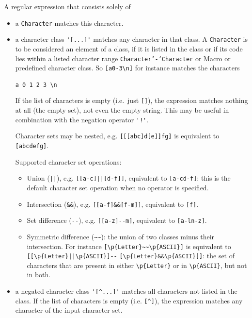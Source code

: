 \documentclass[11pt]{scrartcl}
\begin{document}
A regular expression that consists solely of
\begin{itemize}
\item
  a \texttt{Character} matches this character.

\item
  a character class \verb:'[...]': matches any character in that class.
  A \texttt{Character} is to be considered an element of a class, if it
  is listed in the class or if its code lies within a listed character
  range \texttt{Character'-'Character} or Macro or predefined character
  class. So \verb+[a0-3\n]+ for instance matches the characters

  \verb+a 0 1 2 3 \n+

  If the list of characters is empty (i.e.~just \verb+[]+), the expression
  matches nothing at all (the empty set), not even the empty string. This
  may be useful in combination with the negation operator \verb+'!'+.
  
  Character sets may be nested, e.g. \verb+[[[abc]d[e]]fg]+ is equivalent
  to \verb+[abcdefg]+.

  Supported character set operations:
    
  \begin{itemize}
  \item
    Union (\verb+||+), e.g. \verb+[[a-c]||[d-f]]+, equivalent to 
    \verb+[a-cd-f]+: this is the default character set operation when
    no operator is specified. 

  \item
    Intersection (\verb+&&+), e.g. \verb+[[a-f]&&[f-m]]+, equivalent to
    \verb+[f]+.
    
  \item
    Set difference (\verb+--+), e.g. \verb+[[a-z]--m]+, equivalent to
    \verb+[a-ln-z]+.
    
  \item
    Symmetric difference (\verb+~~+): the union of two classes minus their
    intersection. For instance \verb+[\p{Letter}~~\p{ASCII}]+ is equivalent
    to
    \verb+[[\p{Letter}||\p{ASCII}]--+
    \verb+[\p{Letter}&&\p{ASCII}]]+: the
    set of characters that are present in either \verb+\p{Letter}+ or
    in \verb+\p{ASCII}+, but not in both.

  \end{itemize}

\item 
  a negated character class \verb:'[^...]':  matches all characters not
  listed in the class. If the list of characters is empty (i.e. 
  \verb+[^]+), the expression matches any character of the input
  character set.
  

\end{itemize}
\end{document}
